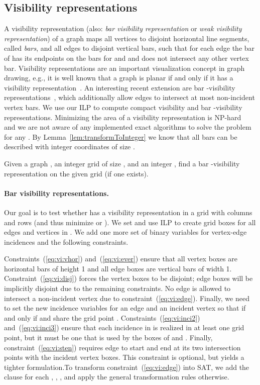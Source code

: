 \documentclass[runningheads]{llncs}
\newcounter{constr}
\begin{document}
\subsection{Visibility representations}

A visibility representation (also: \emph{bar visibility representation} or \emph{weak visibility representation}) of a graph  maps all vertices to disjoint horizontal line segments, called \emph{bars}, and all edges to disjoint vertical bars, such that for each edge  the bar of  has its endpoints on the bars for  and  and does not intersect any other vertex bar. Visibility representations are an important visualization concept in graph drawing, e.g., it is well known that a graph is planar if and only if it has a visibility representation~\cite{Wis85,TT86}.
An interesting recent extension are bar -visibility representations~\cite{deglst-bkvg-07}, which additionally allow edges to intersect at most  non-incident vertex bars. We use our ILP to compute compact visibility and bar -visibility representations. Minimizing the area of a visibility representation is NP-hard~\cite{le-tardhpg-03} and we are not aware of any implemented exact algorithms to solve the problem for any . 
By Lemma~\ref{lem:transformToInteger} we
know that all bars can be described with integer coordinates of size .

\begin{problem}\label{pb:barvis}
	Given a graph , an integer grid of size , and an integer , find a bar -visibility representation on the given grid (if one exists).
\end{problem}

\paragraph{Bar visibility representations.}
Our goal is to test whether  has a visibility representation in a grid with  columns and  rows (and thus minimize  or ). We set  and use ILP  to create grid boxes for all edges and vertices in . We add one more set of binary variables for vertex-edge incidences and the following constraints.


Constraints~(\ref{eq:vi:vhor}) and~(\ref{eq:vi:ever}) ensure that 
all vertex boxes are horizontal bars of height 1 
and all edge boxes are vertical bars of width 1. 
Constraint~(\ref{eq:vi:disj}) forces the vertex boxes to be disjoint; 
edge boxes will be implicitly disjoint due to the remaining constraints. 
No edge is allowed to intersect a non-incident vertex 
due to constraint~(\ref{eq:vi:edge}). 
Finally, we need to set the new incidence variables  
for an edge  and an incident vertex  so that  
if and only if  and  share the grid point . 
Constraints~(\ref{eq:vi:inci2}) and~(\ref{eq:vi:inci3}) ensure that 
each incidence in  is realized in at least one grid point, 
but it must be one that is used by the boxes of  and . 
Finally, constraint~(\ref{eq:vi:sten}) requires edge  
to start and end at its two intersection points 
with the incident vertex boxes. 
This constraint is optional, 
but yields a tighter formulation.To transform constraint~(\ref{eq:vi:edge}) into SAT,
we add the clause 
for each , , , and 
apply the general transformation rules otherwise.
\end{document}

